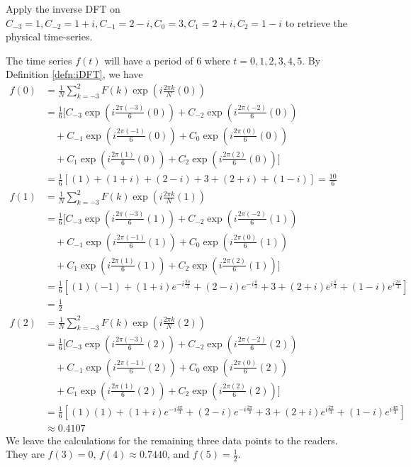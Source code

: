 \begin{exmp}
Apply the inverse DFT on $C_{-3} = 1, C_{-2} = 1 + i, C_{-1} = 2 - i, C_0 = 3, C_1 = 2 + i, C_2 = 1 - i$ to retrieve the physical time-series.
\end{exmp}
\begin{solution}
The time series $f(t)$ will have a period of $6$ where $t = 0,1,2,3,4,5$. By Definition \ref{defn:iDFT}, we have
\begin{align*}
f(0) &= \frac{1}{N}\sum_{k=-3}^{2} F(k)\exp(i\frac{2\pi k}{N}(0)) \\
&= \frac{1}{6}[C_{-3}\exp(i\frac{2\pi (-3)}{6}(0)) + C_{-2}\exp(i\frac{2\pi (-2)}{6}(0)) \\
&\quad + C_{-1}\exp(i\frac{2\pi (-1)}{6}(0)) + C_{0}\exp(i\frac{2\pi (0)}{6}(0)) \\
&\quad + C_{1}\exp(i\frac{2\pi (1)}{6}(0)) + C_{2}\exp(i\frac{2\pi (2)}{6}(0))] \\
&= \frac{1}{6}[(1) + (1+i) + (2-i) + 3 + (2+i) + (1-i)] = \frac{10}{6} \\
f(1) &= \frac{1}{N}\sum_{k=-3}^{2} F(k)\exp(i\frac{2\pi k}{N}(1)) \\
&= \frac{1}{6}[C_{-3}\exp(i\frac{2\pi (-3)}{6}(1)) + C_{-2}\exp(i\frac{2\pi (-2)}{6}(1)) \\
&\quad + C_{-1}\exp(i\frac{2\pi (-1)}{6}(1)) + C_{0}\exp(i\frac{2\pi (0)}{6}(1)) \\
&\quad + C_{1}\exp(i\frac{2\pi (1)}{6}(1)) + C_{2}\exp(i\frac{2\pi (2)}{6}(1))] \\
&= \frac{1}{6}[(1)(-1) + (1+i)e^{-i \frac{2\pi}{3}} + (2-i)e^{-i \frac{\pi}{3}} + 3 + (2+i)e^{i \frac{\pi}{3}} + (1-i)e^{i \frac{2\pi}{3}}] \\
&= \frac{1}{2} \\
f(2) &= \frac{1}{N}\sum_{k=-3}^{2} F(k)\exp(i\frac{2\pi k}{N}(2)) \\
&= \frac{1}{6}[C_{-3}\exp(i\frac{2\pi (-3)}{6}(2)) + C_{-2}\exp(i\frac{2\pi (-2)}{6}(2)) \\
&\quad + C_{-1}\exp(i\frac{2\pi (-1)}{6}(2)) + C_{0}\exp(i\frac{2\pi (0)}{6}(2)) \\
&\quad + C_{1}\exp(i\frac{2\pi (1)}{6}(2)) + C_{2}\exp(i\frac{2\pi (2)}{6}(2))] \\
&= \frac{1}{6}[(1)(1) + (1+i)e^{-i \frac{4\pi}{3}} + (2-i)e^{-i \frac{2\pi}{3}} + 3 + (2+i)e^{i \frac{2\pi}{3}} + (1-i)e^{i \frac{4\pi}{3}}] \\
&\approx 0.4107 
\end{align*}
We leave the calculations for the remaining three data points to the readers. They are $f(3) = 0$, $f(4) \approx 0.7440$, and $f(5) = \frac{1}{2}$.
\end{solution}

